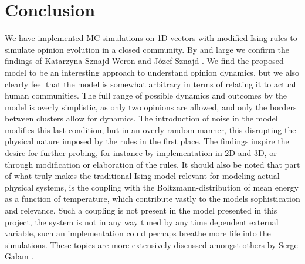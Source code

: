 \documentclass[a4paper]{article}
\begin{document}
\section{Conclusion}
We have implemented MC-simulations on 1D vectors with modified Ising rules to simulate opinion evolution in a closed community. By and large we confirm the findings of Katarzyna Sznajd-Weron and Józef Sznajd \cite{opinion}. We find the proposed model to be an interesting approach to understand opinion dynamics, but we also clearly feel that the model is somewhat arbitrary in terms of relating it to actual human communities. The full range of possible dynamics and outcomes by the model is overly simplistic, as only two opinions are allowed, and only the borders between clusters allow for dynamics. The introduction of noise in the model modifies this last condition, but in an overly random manner, this disrupting the physical nature imposed by the rules in the first place. The findings inspire the desire for further probing, for instance by implementation in 2D and 3D, or through modification or elaboration of the rules. It should also be noted that part of what truly makes the traditional Ising model relevant for modeling actual physical systems, is the coupling with the Boltzmann-distribution of mean energy as a function of temperature, which contribute vastly to the models sophistication and relevance. Such a coupling is not present in the model presented in this project, the system is not in any way tuned by any time dependent external variable, such an implementation could perhaps breathe more life into the simulations. These topics are more extensively discussed amongst others by Serge Galam \cite{galam}.

%
%



\begin{appendix}




\end{appendix}
\end{document}
